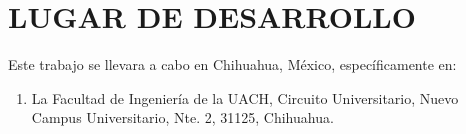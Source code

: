 \documentclass[12pt]{report}
\begin{document}
	\chapter{LUGAR DE DESARROLLO}
	
	Este trabajo se llevara a cabo en Chihuahua, México, específicamente en:
	
	\begin{enumerate}
		\item La Facultad de Ingeniería de la UACH, Circuito Universitario, Nuevo Campus Universitario, Nte. 2, 31125, Chihuahua.
	\end{enumerate}
	 
	
	\pagebreak
	\printbibliography
	\thispagestyle{empty}
	
\end{document}

